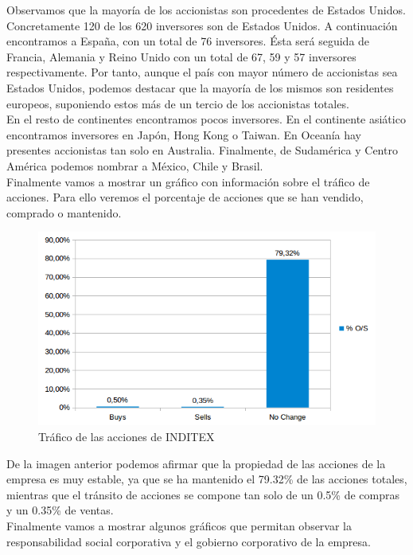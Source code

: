 \documentclass[11pt]{article}
\theoremstyle{plain}
\theoremstyle{definition}
\begin{document}
Observamos que la mayoría de los accionistas son procedentes de
Estados Unidos.  Concretamente 120 de los 620 inversores son de
Estados Unidos. A continuación encontramos a España, con un total de
76 inversores. Ésta será seguida de Francia, Alemania y Reino Unido
con un total de 67, 59 y 57 inversores respectivamente. Por tanto,
aunque el país con mayor número de accionistas sea Estados Unidos,
podemos destacar que la mayoría de los mismos son residentes
europeos, suponiendo estos más de un tercio de los accionistas totales.\\


En el resto de continentes encontramos pocos inversores. En el
continente asiático encontramos inversores en Japón, Hong Kong o
Taiwan. En Oceanía hay presentes accionistas tan solo en
Australia. Finalmente, de Sudamérica y Centro América podemos
nombrar a México, Chile y Brasil.\\

Finalmente vamos a mostrar un gráfico con información sobre el tráfico
de acciones.  Para ello veremos el porcentaje de acciones que se han
vendido, comprado o mantenido.


\begin{figure}[H]
  \centering \includegraphics[width=\textwidth]{graphs/rotations.png}
  \caption{Tráfico de las acciones de INDITEX}
\end{figure}

De la imagen anterior podemos afirmar que la propiedad de las acciones
de la empresa es muy estable, ya que se ha mantenido el 79.32\% de las
acciones totales, mientras que el tránsito de acciones se compone tan
solo de un 0.5\% de compras y un 0.35\%
de ventas.\\

Finalmente vamos a mostrar algunos gráficos que permitan observar la
responsabilidad social corporativa y el gobierno corporativo de la
empresa.
\end{document}
